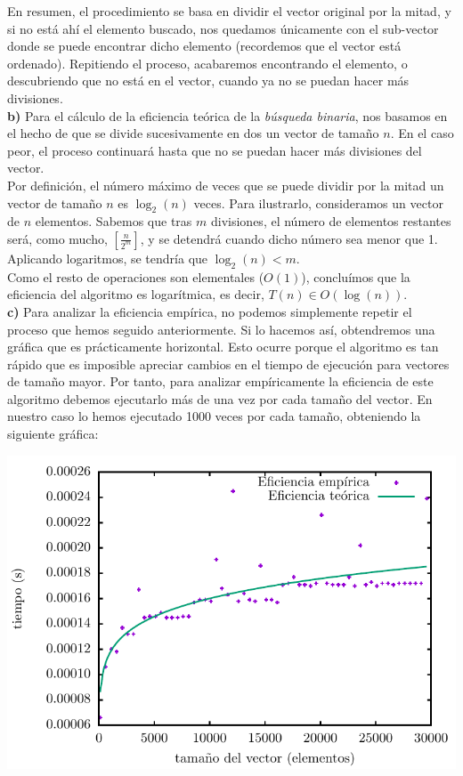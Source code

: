 \documentclass[11pt,a4paper]{article}
\begin{document}
En resumen, el procedimiento se basa en dividir el vector original por la mitad, y si no está ahí el elemento buscado, nos quedamos únicamente con el sub-vector donde se puede encontrar dicho elemento (recordemos que el vector está ordenado). Repitiendo el proceso, acabaremos encontrando el elemento, o descubriendo que no está en el vector, cuando ya no se puedan hacer más divisiones.\\

\textbf{b)} Para el cálculo de la eficiencia teórica de la \textit{búsqueda binaria}, nos basamos en el hecho de que se divide sucesivamente en dos un vector de tamaño $n$. En el caso peor, el proceso continuará hasta que no se puedan hacer más divisiones del vector.\\

Por definición, el número máximo de veces que se puede dividir por la mitad un vector de tamaño $n$ es $\log_2 (n)$ veces. Para ilustrarlo, consideramos un vector de $n$ elementos. Sabemos que tras $m$ divisiones, el número de elementos restantes será, como mucho, $\left[\frac{n}{2^m}\right]$, y se detendrá cuando dicho número sea menor que 1. Aplicando logaritmos, se tendría que $\log_2 (n) < m$.\\

Como el resto de operaciones son elementales ($O(1)$), concluímos que la eficiencia del algoritmo es logarítmica, es decir, $T(n) \in O(\log (n))$.\\

\textbf{c)} Para analizar la eficiencia empírica, no podemos simplemente repetir el proceso que hemos seguido anteriormente. Si lo hacemos así, obtendremos una gráfica que es prácticamente horizontal. Esto ocurre porque el algoritmo es tan rápido que es imposible apreciar cambios en el tiempo de ejecución para vectores de tamaño mayor. Por tanto, para analizar empíricamente la eficiencia de este algoritmo debemos ejecutarlo más de una vez por cada tamaño del vector. En nuestro caso lo hemos ejecutado 1000 veces por cada tamaño, obteniendo la siguiente gráfica:

\begin{center}
	\includegraphics{img/tiempos_binaria.pdf}
\end{center}
\end{document}
